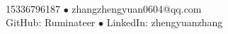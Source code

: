 \begin{center}
    \\
    \vspace{1ex}
    15336796187 $\bullet$ 
    zhangzhengyuan0604@qq.com\\
    GitHub: Ruminateer $\bullet$ 
    LinkedIn: zhengyuanzhang\\
\end{center}